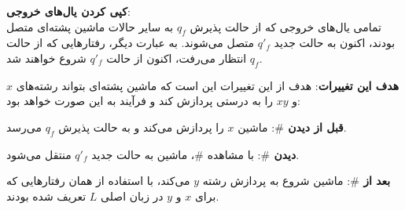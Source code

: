\begin{enumerate}
	\textbf{کپی کردن یال‌های خروجی}: \\
	تمامی یال‌های خروجی که از حالت پذیرش \( q_f \) به سایر حالات ماشین پشته‌ای متصل بودند، اکنون به حالت جدید \( q'_f \) متصل می‌شوند. به عبارت دیگر، رفتارهایی که از حالت \( q_f \) انتظار می‌رفت، اکنون از حالت \( q'_f \) شروع خواهند شد.\bigskip
	
	\textbf{هدف این تغییرات}: 
	هدف از این تغییرات این است که ماشین پشته‌ای بتواند رشته‌های \( x \) و \( xy \) را به درستی پردازش کند و فرآیند به این صورت خواهد بود:
	
	\textbf{قبل از دیدن \( \# \)}: ماشین \( x \) را پردازش می‌کند و به حالت پذیرش \( q_f \) می‌رسد. 
	
	\textbf{دیدن \( \# \)}: با مشاهده \( \# \)، ماشین به حالت جدید \( q'_f \) منتقل می‌شود. 
	
	\textbf{بعد از \( \# \)}: ماشین شروع به پردازش رشته \( y \) می‌کند، با استفاده از همان رفتارهایی که برای \( x \) و \( y \) در زبان اصلی \( L \) تعریف شده بودند.
	
	
\end{enumerate}


